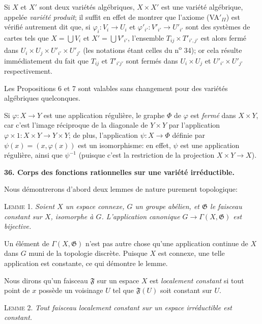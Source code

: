 Si $X$ et $X'$ sont deux variétés algébriques, $X \times X'$ est une variété algébrique, appelée \textit{variété produit}; il suffit en effet de montrer que l'axiome (VA$'_{II}$) est vérifié autrement dit que, si $\varphi_i : V_i \to U_i$ et $\varphi'_{i'} : V'_{i'} \to U'_{i'}$ sont des systèmes de cartes tels que $X = \bigcup V_i$ et $X' = \bigcup V'_{i'}$, l'ensemble $T_{ij} \times T'_{i',j'}$ est alors fermé dans $U_i \times U_j \times U'_{i'} \times U'_{j'}$ (les notations étant celles du n\textsuperscript{o} 34); or cela résulte immédiatement du fait que $T_{ij}$ et $T'_{i'j'}$ sont fermés dans $U_i \times U_j$ et $U'_{i'} \times U'_{j'}$ respectivement.

Les Propositions 6 et 7 sont valables sans changement pour des variétés algébriques quelconques.

Si $\varphi : X \to Y$ est une application régulière, le graphe $\Phi$ de $\varphi$ est \textit{fermé} dans $X \times Y$, car c'est l'image réciproque de la diagonale de $Y \times Y$ par l'application $\varphi \times 1 : X \times Y \to Y \times Y$; de plus, l'application $\psi : X \to \Phi$ définie par $\psi(x) = (x, \varphi(x))$ est un isomorphisme: en effet, $\psi$ est une application régulière, ainsi que $\psi^{-1}$ (puisque c'est la restriction de la projection $X \times Y \to X$).


\textbf{36. Corps des fonctions rationnelles sur une variété irréductible.}

Nous démontrerons d'abord deux lemmes de nature purement topologique:



\textsc{Lemme} 1. \textit{Soient $X$ un espace connexe, $G$ un groupe abélien, et $\mathfrak{G}$ le faisceau constant sur $X$, isomorphe à $G$. L'application canonique $G \to \Gamma(X, \mathfrak{G})$ est bijective.}

Un élément de $\Gamma(X, \mathfrak{G})$ n'est pas autre chose qu'une application continue de $X$ dans $G$ muni de la topologie discrète. Puisque $X$ est connexe, une telle application est constante, ce qui démontre le lemme.

Nous dirons qu'un faisceau $\mathfrak{F}$ sur un espace $X$ est \textit{localement constant} si tout point de $x$ possède un voisinage $U$ tel que $\mathfrak{F}(U)$ soit constant sur $U$.

\textsc{Lemme} 2. \textit{Tout faisceau localement constant sur un espace irréductible est constant.}

